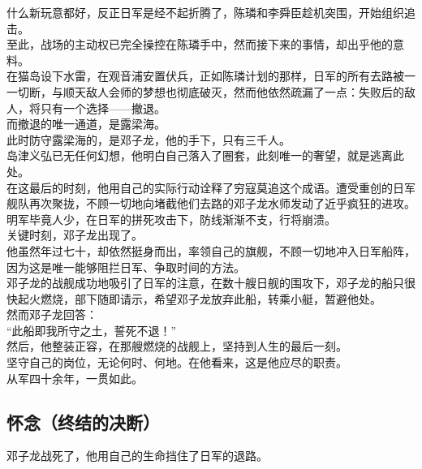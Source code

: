 \begin{multicols}{\theparacolNo}
什么新玩意都好，反正日军是经不起折腾了，陈璘和李舜臣趁机突围，开始组织追击。\\

至此，战场的主动权已完全操控在陈璘手中，然而接下来的事情，却出乎他的意料。\\

在猫岛设下水雷，在观音浦安置伏兵，正如陈璘计划的那样，日军的所有去路被一一切断，与顺天敌人会师的梦想也彻底破灭，然而他依然疏漏了一点：失败后的敌人，将只有一个选择——撤退。\\

而撤退的唯一通道，是露梁海。\\

此时防守露梁海的，是邓子龙，他的手下，只有三千人。\\

岛津义弘已无任何幻想，他明白自己落入了圈套，此刻唯一的奢望，就是逃离此处。\\

在这最后的时刻，他用自己的实际行动诠释了穷寇莫追这个成语。遭受重创的日军舰队再次聚拢，不顾一切地向堵截他们去路的邓子龙水师发动了近乎疯狂的进攻。\\

明军毕竟人少，在日军的拼死攻击下，防线渐渐不支，行将崩溃。\\

关键时刻，邓子龙出现了。\\

他虽然年过七十，却依然挺身而出，率领自己的旗舰，不顾一切地冲入日军船阵，因为这是唯一能够阻拦日军、争取时间的方法。\\

邓子龙的战舰成功地吸引了日军的注意，在数十艘日舰的围攻下，邓子龙的船只很快起火燃烧，部下随即请示，希望邓子龙放弃此船，转乘小艇，暂避他处。\\

然而邓子龙回答：\\

“此船即我所守之土，誓死不退！”\\

然后，他整装正容，在那艘燃烧的战舰上，坚持到人生的最后一刻。\\

坚守自己的岗位，无论何时、何地。在他看来，这是他应尽的职责。\\

从军四十余年，一贯如此。\\

\subsection{怀念（终结的决断）}
邓子龙战死了，他用自己的生命挡住了日军的退路。\\


\end{multicols}
